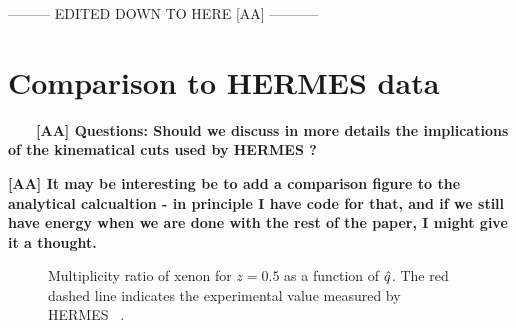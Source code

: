

{\color{red} --------- EDITED DOWN TO HERE [AA] -----------}


\section{Comparison to HERMES data}

\ \ \ \ 
{\bf [AA] Questions: Should we discuss in more details the implications of the 
kinematical cuts used by HERMES ?}

{\bf [AA] It may be interesting be to add a comparison figure to the analytical calcualtion - in principle I have code for that, and if we still have energy when we are done with the rest of the paper, I might give it a thought.}


\begin{figure}[tbp]
  \centering
{}
\caption {Multiplicity ratio of xenon for $z = 0.5$ as a function of ${\hat q}$. 
The red dashed line indicates the experimental value measured by HERMES~%
\cite{Airapetian:2007vu}.}
\label{fig:qhat}
\end{figure}

